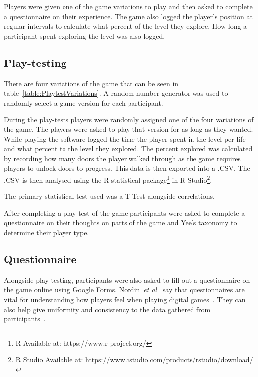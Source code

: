\documentclass[journal]{IEEEtran}
\begin{document}
	Players were given one of the game variations to play and then asked to complete a questionnaire on their experience. The game also logged the player's position at regular intervals to calculate what percent of the level they explore. How long a participant spent exploring the level was also logged.
	
	\subsection{Play-testing}
	There are four variations of the game that can be seen in table~\ref{table:PlaytestVariations}.  A random number generator was used to randomly select a game version for each participant.

	
	During the play-tests players were randomly assigned one of the four variations of the game. The players were asked to play that version for as long as they wanted. While playing the software logged the time the player spent in the level per life and what percent to the level they explored. The percent explored was calculated by recording how many doors the player walked through as the game requires players to unlock doors to progress. This data is then exported into a .CSV. The .CSV is then analysed using the R statistical package\footnote[2]{R Available at: https://www.r-project.org/} in R Studio\footnote[3]{R Studio Available at: https://www.rstudio.com/products/rstudio/download/}.
	
	
	The primary statistical test used was a T-Test alongside correlations.
	
	After completing a play-test of the game participants were asked to complete a questionnaire on their thoughts on parts of the game and Yee's taxonomy to determine their player type.
	
	\subsection{Questionnaire} \label{Questionnaire}
	
	Alongside play-testing, participants were also asked to fill out a questionnaire on the game online using Google Forms. Nordin~\textit{et al}~\cite{nordin2014} say that questionnaires are vital for understanding how players feel when playing digital games~\cite{nordin2014,Denisova2016}. They can also help give uniformity and consistency to the data gathered from participants~\cite{Denisova2016}.
	
\end{document}

